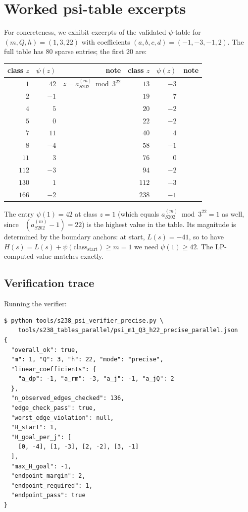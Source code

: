 \documentclass[11pt,a4paper]{article}
\theoremstyle{plain}
\theoremstyle{definition}
\newcommand{\aSat}{a_{S202}^{(m)}}
\DeclareMathOperator{\nuthree}{\nu_3}
\begin{document}
\section{Worked psi-table excerpts}\label{app:psi-tables}

For concreteness, we exhibit excerpts of the validated
$\psi$-table for $(m, Q, h) = (1, 3, 22)$ with coefficients
$(a, b, c, d) = (-1, -3, -1, 2)$. The full table has $80$ sparse
entries; the first $20$ are:

\begin{center}\footnotesize
\begin{tabular}{rrr|rrr}
\toprule
class $z$ & $\psi(z)$ & note & class $z$ & $\psi(z)$ & note \\
\midrule
$1$  & $42$  & $z = \aSat \bmod 3^{22}$ & $13$  & $-3$  & \\
$2$  & $-1$  &                          & $19$  & $7$   & \\
$4$  & $5$   &                          & $20$  & $-2$  & \\
$5$  & $0$   &                          & $22$  & $-2$  & \\
$7$  & $11$  &                          & $40$  & $4$   & \\
$8$  & $-4$  &                          & $58$  & $-1$  & \\
$11$ & $3$   &                          & $76$  & $0$   & \\
$112$ & $-3$ &                          & $94$  & $-2$  & \\
$130$ & $1$  &                          & $112$ & $-3$  & \\
$166$ & $-2$ &                          & $238$ & $-1$  & \\
\bottomrule
\end{tabular}
\end{center}

\noindent The entry $\psi(1) = 42$ at class $z = 1$ (which equals
$\aSat \bmod 3^{22} = 1$ as well, since $\nuthree(\aSat - 1) = 22$)
is the highest value in the table. Its magnitude is determined by
the boundary anchors: at start, $L(s) = -41$, so to have
$H(s) = L(s) + \psi(\text{class}_{\text{start}}) \ge m = 1$ we need
$\psi(1) \ge 42$. The LP-computed value matches exactly.

\subsection*{Verification trace}

Running the verifier:
\begin{lstlisting}
$ python tools/s238_psi_verifier_precise.py \
    tools/s238_tables_parallel/psi_m1_Q3_h22_precise_parallel.json
{
  "overall_ok": true,
  "m": 1, "Q": 3, "h": 22, "mode": "precise",
  "linear_coefficients": {
    "a_dp": -1, "a_rm": -3, "a_j": -1, "a_jQ": 2
  },
  "n_observed_edges_checked": 136,
  "edge_check_pass": true,
  "worst_edge_violation": null,
  "H_start": 1,
  "H_goal_per_j": [
    [0, -4], [1, -3], [2, -2], [3, -1]
  ],
  "max_H_goal": -1,
  "endpoint_margin": 2,
  "endpoint_required": 1,
  "endpoint_pass": true
}
\end{lstlisting}
\end{document}
